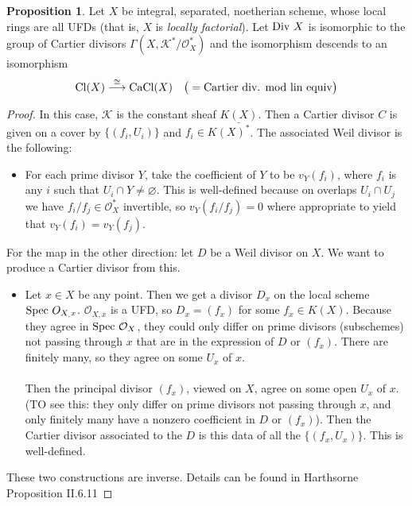 \documentclass[10pt,reqno]{amsart}
\theoremstyle{definition}
\newtheorem{proposition}[theorem]{Proposition}
\theoremstyle{remark}
\numberwithin{equation}{section}
\numberwithin{theorem}{section}
\newcommand{\OO}{{\mathcal O}}
\newcommand{\spec}{\textup{Spec }}
\newcommand{\Div}{\textup{Div }}
\newcommand{\cl}{\textup{Cl}}
\newcommand{\K}{{\mathscr K}}
\begin{document}
\begin{proposition} Let $X$ be integral, separated, noetherian scheme, whose local rings are all UFDs (that is, $X$ is \textit{locally factorial}). Let $\Div X$ is isomorphic to the group of Cartier divisors $\Gamma(X,\K^*/\OO_X^*)$ and the isomorphism descends to an isomorphism 
\[\cl(X) \stackrel{\cong}{\longrightarrow} \textup{CaCl}(X) \quad \big( = \textup{Cartier div. mod lin equiv}\big)\]
\end{proposition}
\begin{proof}
In this case, $\K$ is the constant sheaf $\underline{K(X)}$. Then a Cartier divisor $C$ is given on a cover by $\{(f_i,U_i)\}$ and $f_i \in K(X)^*$. The associated Weil divisor is the following:
\begin{itemize}
\item For each prime divisor $Y$, take the coefficient of $Y$ to be $v_Y(f_i)$, where $f_i$ is any $i$ such that $U_i \cap Y \ne \varnothing$. This is well-defined because on overlaps $U_i \cap U_j$ we have $f_i/f_j \in \OO_X^*$ invertible, so $v_Y(f_i/f_j) = 0$ where appropriate to yield that $v_Y(f_i) = v_Y(f_j)$.
\end{itemize}
For the map in the other direction: let $D$ be a Weil divisor on $X$. We want to produce a Cartier divisor from this.
\begin{itemize}
\item Let $x \in X$ be any point. Then we get a divisor $D_x$ on the local scheme $\spec O_{X_,x}$. $\OO_{X,x}$ is a UFD, so $D_x = (f_x)$ for some $f_x \in K(X)$. Because they agree in $\spec \OO_X$, they could only differ on prime divisors (subschemes) not passing through $x$ that are in the expression of $D$ or $(f_x)$. There are finitely many, so they agree on some $U_x$ of $x$.
\\
\\
Then the principal divisor $(f_x)$, viewed on $X$, agree on some open $U_x$ of $x$. (TO see this: they only differ on prime divisors not passing through $x$, and only finitely many have a nonzero coefficient in $D$ or $(f_x)$). Then the Cartier divisor associated to the $D$ is this data of all the $\{(f_x,U_x)\}$. This is well-defined.
\end{itemize}%

These two constructions are inverse. Details can be found in Harthsorne Proposition II.6.11
\end{proof}
\end{document}
